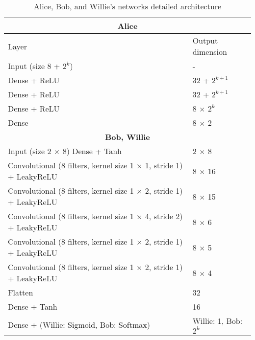 \begin{table}[tph!]
	\begin{adjustbox}{width=0.85\columnwidth,center}
		\begin{tabular}{|l|l|} 
			\hline
			\multicolumn{2}{|c|}{\textbf{Alice}} 															\\
			\hline
			Layer 																	&	Output dimension	\\
			\hline
			Input (size 8 + $2^k$)      											&	-    	 		    \\ 
			Dense + ReLU          													&	32 + $2^{k+1}$		\\
			Dense + ReLU          													&	32 + $2^{k+1}$		\\
			Dense + ReLU   															&	8 $\times$ $2^k$	\\
			Dense																	&	8 $\times$ 2	\\
			\hline   
			\hline												
			\multicolumn{2}{|c|}{\textbf{Bob, Willie}} 											\\
			\hline
			Input (size 2 $\times$ 8)
			Dense + Tanh																&	2 $\times$ 8			\\
			Convolutional (8 filters, kernel size 1 $\times$ 1, stride 1) + LeakyReLU 	&   8 $\times$ 16			\\
			Convolutional (8 filters, kernel size 1 $\times$ 2, stride 1) + LeakyReLU 	&   8 $\times$ 15			\\
			Convolutional (8 filters, kernel size 1 $\times$ 4, stride 2) + LeakyReLU 	&   8 $\times$ 6			\\
			Convolutional (8 filters, kernel size 1 $\times$ 2, stride 1) + LeakyReLU 	&   8 $\times$ 5			\\
			Convolutional (8 filters, kernel size 1 $\times$ 2, stride 1) + LeakyReLU 	&   8 $\times$ 4			\\
			Flatten															 			&   32						\\
			Dense + Tanh																&	16						\\
			Dense + (Willie: Sigmoid, Bob: Softmax)										&	Willie: 1, Bob:	$2^k$	\\
			\hline
		\end{tabular}
	\end{adjustbox}
	\caption{Alice, Bob, and Willie's networks detailed architecture}
	\label{table:covert_models_structure}
\end{table}
